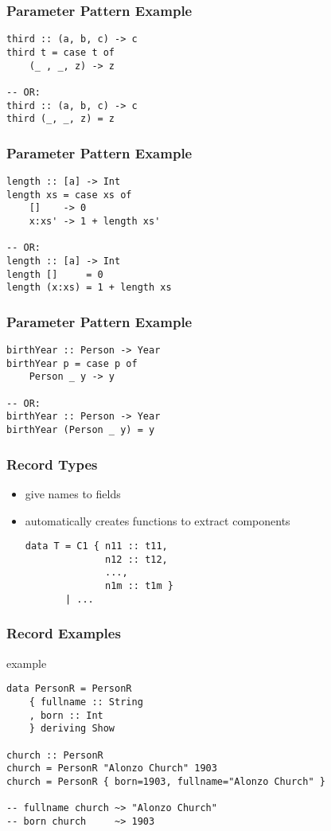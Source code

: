 \documentclass[dvipsnames]{beamer}
\theoremstyle{plain}
\begin{document}
\begin{frame}[fragile]
  \frametitle{Parameter Pattern Example}

  \begin{lstlisting}
third :: (a, b, c) -> c
third t = case t of
    (_ , _, z) -> z

-- OR:
third :: (a, b, c) -> c
third (_, _, z) = z
  \end{lstlisting}
\end{frame}

\begin{frame}[fragile]
  \frametitle{Parameter Pattern Example}

  \begin{lstlisting}[deletekeywords={length}]
length :: [a] -> Int
length xs = case xs of
    []    -> 0
    x:xs' -> 1 + length xs'

-- OR:
length :: [a] -> Int
length []     = 0
length (x:xs) = 1 + length xs
  \end{lstlisting}
\end{frame}

\begin{frame}[fragile]
  \frametitle{Parameter Pattern Example}

  \begin{lstlisting}
birthYear :: Person -> Year
birthYear p = case p of
    Person _ y -> y

-- OR:
birthYear :: Person -> Year
birthYear (Person _ y) = y
  \end{lstlisting}
\end{frame}

\begin{frame}[fragile]
  \frametitle{Record Types}

  \begin{itemize}
    \item give names to fields
    \item automatically creates functions to extract components

    \medskip
    \begin{lstlisting}[style=syntax]
data T = C1 { n11 :: t11,
              n12 :: t12,
              ...,
              n1m :: t1m }
       | ...
    \end{lstlisting}
  \end{itemize}
\end{frame}

\begin{frame}[fragile]
  \frametitle{Record Examples}

  \begin{exampleblock}{example}
    \begin{lstlisting}
data PersonR = PersonR
    { fullname :: String
    , born :: Int
    } deriving Show

church :: PersonR
church = PersonR "Alonzo Church" 1903
church = PersonR { born=1903, fullname="Alonzo Church" }

-- fullname church ~> "Alonzo Church"
-- born church     ~> 1903
    \end{lstlisting}
  \end{exampleblock}
\end{frame}
\end{document}
